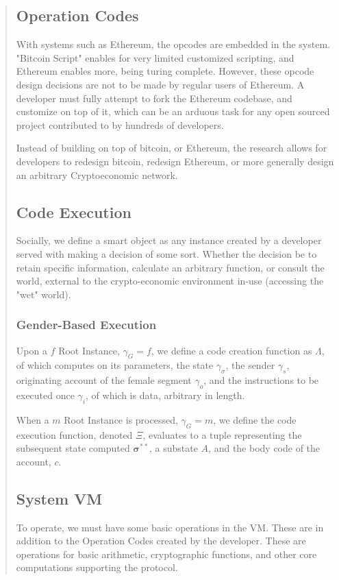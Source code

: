 \documentclass[12pt, titlepage, twocolumn]{report}
\begin{document}
\begin{quotation}
 
\subsection{Operation Codes}
With systems such as Ethereum, the opcodes are embedded in the system. "Bitcoin Script" enables for very limited customized scripting, and Ethereum enables more, being turing complete. However, these opcode design decisions are not to be made by regular users of Ethereum. A developer must fully attempt to fork the Ethereum codebase, and customize on top of it, which can be an arduous task for any open sourced project contributed to by hundreds of developers. 

Instead of building on top of bitcoin, or Ethereum, the research allows for developers to redesign bitcoin, redesign Ethereum, or more generally design an arbitrary Cryptoeconomic network.

\subsection{Code Execution}
Socially, we define a smart object as any instance created by a developer served with making a decision of some sort. Whether the decision be to retain specific information, calculate an arbitrary function, or consult the world, external to the crypto-economic environment in-use (accessing the "wet" world).

\subsubsection{Gender-Based Execution}
Upon a \( f \) Root Instance, \( \gamma_{G} = f \), we define a code creation function as \( \Lambda \), of which computes on its parameters, the state \( \gamma_{\sigma} \), the sender \( \gamma_{s} \), originating account of the female segment \( \gamma_{o} \), and the instructions to be executed once \( \gamma_{i} \), of which is data, arbitrary in length.


When a \(m\) Root Instance is processed, \(\gamma_{G} = m\), we define the code execution function, denoted \( \Xi \), evaluates to a tuple representing the subsequent state computed \( \boldsymbol{\sigma}^{**} \), a substate \(A\), and the body code of the account, \(c\).



\subsection{System VM}
To operate, we must have some basic operations in the VM. These are in addition to the Operation Codes created by the developer. These are operations for basic arithmetic, cryptographic functions, and other core computations supporting the protocol.



\end{quotation}
\end{document}
